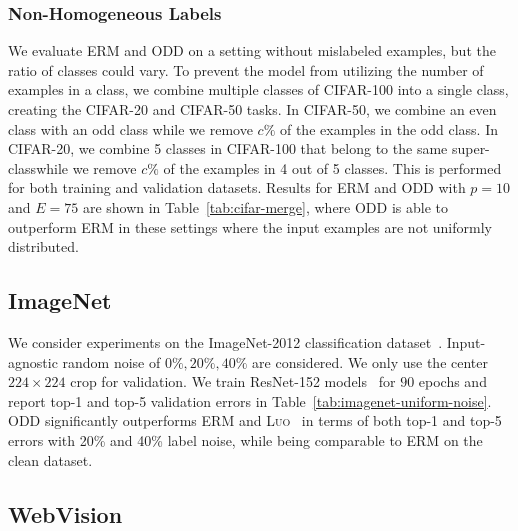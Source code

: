 \documentclass[a4paper,11pt]{article}
\begin{document}
\subsubsection{Non-Homogeneous Labels}
We evaluate \textsc{ERM} and \textsc{ODD} on a setting without mislabeled examples, but the ratio of classes could vary. To prevent the model from utilizing the number of examples in a class, we combine multiple classes of CIFAR-100 into a single class, creating the CIFAR-20 and CIFAR-50 tasks. In CIFAR-50, we combine an even class with an odd class while we remove $c\%$ of the examples in the odd class. In CIFAR-20, we combine 5 classes in CIFAR-100 that belong to the same super-classwhile we remove $c\%$ of the examples in 4 out of 5 classes. This is performed for both training and validation datasets. Results for \textsc{ERM} and \textsc{ODD} with $p = 10$ and $E = 75$ are shown in Table~\ref{tab:cifar-merge}, where \textsc{ODD} is able to outperform \textsc{ERM} in these settings where the input examples are not uniformly distributed.





\subsection{ImageNet}
\label{sec:exp-imagenet}
We consider experiments on the ImageNet-2012 classification dataset~\cite{russakovsky2015imagenet}.  Input-agnostic random noise of $0\%, 20\%, 40\%$ are considered. We only use the center $224 \times 224$ crop for validation. 
We train ResNet-152 models~\cite{he2015deep} for $90$ epochs and report top-1 and top-5 validation errors in Table~\ref{tab:imagenet-uniform-noise}. \textsc{ODD} significantly outperforms \textsc{ERM} and \textsc{Luo}~\cite{luo2019simple} in terms of both top-1 and top-5 errors with 20\% and 40\% label noise, while being comparable to \textsc{ERM} on the clean dataset.







\subsection{WebVision}
\label{sec:exp-webvision}
\end{document}
